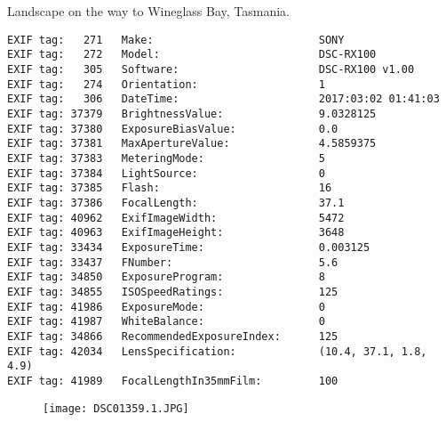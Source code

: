 \section{\protect{}}
\noindent Landscape on the way to Wineglass Bay, Tasmania.
\noindent
\begin{lstlisting}
EXIF tag:   271   Make:                          SONY
EXIF tag:   272   Model:                         DSC-RX100
EXIF tag:   305   Software:                      DSC-RX100 v1.00
EXIF tag:   274   Orientation:                   1
EXIF tag:   306   DateTime:                      2017:03:02 01:41:03
EXIF tag: 37379   BrightnessValue:               9.0328125
EXIF tag: 37380   ExposureBiasValue:             0.0
EXIF tag: 37381   MaxApertureValue:              4.5859375
EXIF tag: 37383   MeteringMode:                  5
EXIF tag: 37384   LightSource:                   0
EXIF tag: 37385   Flash:                         16
EXIF tag: 37386   FocalLength:                   37.1
EXIF tag: 40962   ExifImageWidth:                5472
EXIF tag: 40963   ExifImageHeight:               3648
EXIF tag: 33434   ExposureTime:                  0.003125
EXIF tag: 33437   FNumber:                       5.6
EXIF tag: 34850   ExposureProgram:               8
EXIF tag: 34855   ISOSpeedRatings:               125
EXIF tag: 41986   ExposureMode:                  0
EXIF tag: 41987   WhiteBalance:                  0
EXIF tag: 34866   RecommendedExposureIndex:      125
EXIF tag: 42034   LensSpecification:             (10.4, 37.1, 1.8, 4.9)
EXIF tag: 41989   FocalLengthIn35mmFilm:         100

\end{lstlisting}
\clearpage
\begin{figure}
\raggedleft
\texttt{[image: DSC01359.1.JPG]}
\end{figure}


\clearpage
